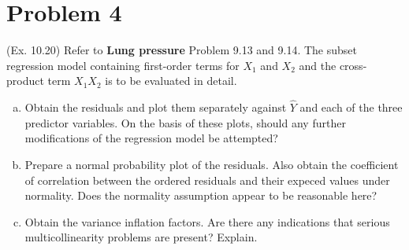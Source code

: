 \documentclass[10pt]{report}
\begin{document}
\section*{Problem 4}
(Ex. 10.20) Refer to \textbf{Lung pressure} Problem 9.13 and 9.14. The subset regression model containing first-order terms for $X_1$ and $X_2$ and the cross-product term $X_1 X_2$ is to be evaluated in detail.
\begin{enumerate}[a.]
	\item 
	Obtain the residuals and plot them separately against $\hat{Y}$ and each of the three predictor variables. On the basis of these plots, should any further modifications of the regression model be attempted?
	
	\item 
	Prepare a normal probability plot of the residuals. Also obtain the coefficient of correlation between the ordered residuals and their expeced values under normality. Does the normality assumption appear to be reasonable here?
	
	\item 
	Obtain the variance inflation factors. Are there any indications that serious multicollinearity problems are present? Explain.
\end{enumerate}
\end{document}
